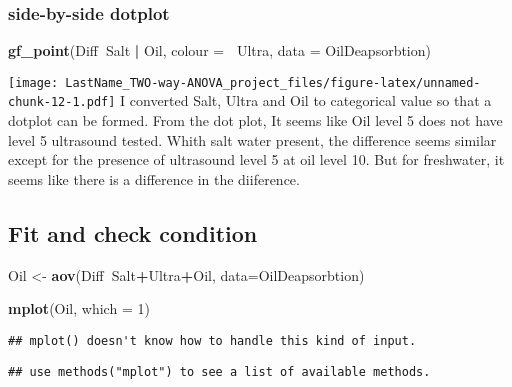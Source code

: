 \documentclass[]{article}
\newenvironment{Shaded}{\begin{snugshade}}{\end{snugshade}}
\newcommand{\DataTypeTok}[1]{\textcolor[rgb]{0.13,0.29,0.53}{#1}}
\newcommand{\DecValTok}[1]{\textcolor[rgb]{0.00,0.00,0.81}{#1}}
\newcommand{\KeywordTok}[1]{\textcolor[rgb]{0.13,0.29,0.53}{\textbf{#1}}}
\newcommand{\NormalTok}[1]{#1}
\newcommand{\OperatorTok}[1]{\textcolor[rgb]{0.81,0.36,0.00}{\textbf{#1}}}
\newcommand{\StringTok}[1]{\textcolor[rgb]{0.31,0.60,0.02}{#1}}
\begin{document}
\hypertarget{side-by-side-dotplot-2}{%
\subsubsection{side-by-side dotplot}\label{side-by-side-dotplot-2}}

\begin{Shaded}
\begin{Highlighting}[]
\KeywordTok{gf_point}\NormalTok{(Diff}\OperatorTok{~}\NormalTok{Salt }\OperatorTok{|}\StringTok{ }\NormalTok{Oil, }\DataTypeTok{colour =} \OperatorTok{~}\NormalTok{Ultra, }\DataTypeTok{data =}\NormalTok{ OilDeapsorbtion)}
\end{Highlighting}
\end{Shaded}

\texttt{[image: LastName\_TWO-way-ANOVA\_project\_files/figure-latex/unnamed-chunk-12-1.pdf]}
I converted Salt, Ultra and Oil to categorical value so that a dotplot
can be formed. From the dot plot, It seems like Oil level 5 does not
have level 5 ultrasound tested. Whith salt water present, the difference
seems similar except for the presence of ultrasound level 5 at oil level
10. But for freshwater, it seems like there is a difference in the
diiference.

\hypertarget{fit-and-check-condition}{%
\subsection{Fit and check condition}\label{fit-and-check-condition}}

\begin{Shaded}
\begin{Highlighting}[]
\NormalTok{Oil <-}\StringTok{ }\KeywordTok{aov}\NormalTok{(Diff}\OperatorTok{~}\NormalTok{Salt}\OperatorTok{+}\NormalTok{Ultra}\OperatorTok{+}\NormalTok{Oil, }\DataTypeTok{data=}\NormalTok{OilDeapsorbtion)}

\KeywordTok{mplot}\NormalTok{(Oil, }\DataTypeTok{which =} \DecValTok{1}\NormalTok{)}
\end{Highlighting}
\end{Shaded}

\begin{verbatim}
## mplot() doesn't know how to handle this kind of input.
\end{verbatim}

\begin{verbatim}
## use methods("mplot") to see a list of available methods.
\end{verbatim}
\end{document}

